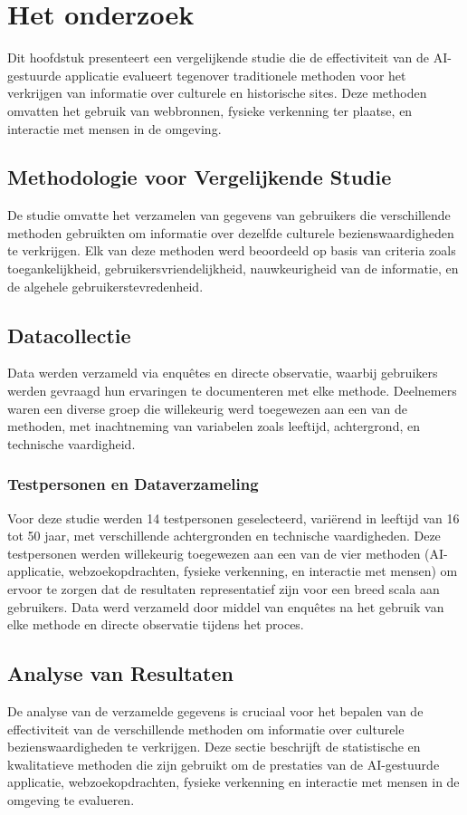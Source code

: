 \chapter{Het onderzoek}%
\label{ch:Het onderzoek}

Dit hoofdstuk presenteert een vergelijkende studie die de effectiviteit van de AI-gestuurde applicatie evalueert tegenover traditionele methoden voor het verkrijgen van informatie over culturele en historische sites. Deze methoden omvatten het gebruik van webbronnen, fysieke verkenning ter plaatse, en interactie met mensen in de omgeving.

\section{Methodologie voor Vergelijkende Studie}
De studie omvatte het verzamelen van gegevens van gebruikers die verschillende methoden gebruikten om informatie over dezelfde culturele bezienswaardigheden te verkrijgen. Elk van deze methoden werd beoordeeld op basis van criteria zoals toegankelijkheid, gebruikersvriendelijkheid, nauwkeurigheid van de informatie, en de algehele gebruikerstevredenheid.

\section{Datacollectie}
Data werden verzameld via enquêtes en directe observatie, waarbij gebruikers werden gevraagd hun ervaringen te documenteren met elke methode. Deelnemers waren een diverse groep die willekeurig werd toegewezen aan een van de methoden, met inachtneming van variabelen zoals leeftijd, achtergrond, en technische vaardigheid.

\subsection{Testpersonen en Dataverzameling}
Voor deze studie werden 14 testpersonen geselecteerd, variërend in leeftijd van 16 tot 50 jaar, met verschillende achtergronden en technische vaardigheden. Deze testpersonen werden willekeurig toegewezen aan een van de vier methoden (AI-applicatie, webzoekopdrachten, fysieke verkenning, en interactie met mensen) om ervoor te zorgen dat de resultaten representatief zijn voor een breed scala aan gebruikers. Data werd verzameld door middel van enquêtes na het gebruik van elke methode en directe observatie tijdens het proces.

\section{Analyse van Resultaten}
De analyse van de verzamelde gegevens is cruciaal voor het bepalen van de effectiviteit van de verschillende methoden om informatie over culturele bezienswaardigheden te verkrijgen. Deze sectie beschrijft de statistische en kwalitatieve methoden die zijn gebruikt om de prestaties van de AI-gestuurde applicatie, webzoekopdrachten, fysieke verkenning en interactie met mensen in de omgeving te evalueren.

